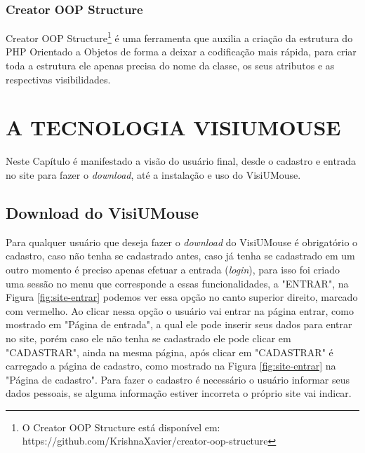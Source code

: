 \subsection{Creator OOP Structure}
Creator OOP Structure\footnote{O Creator OOP Structure está disponível em: https://github.com/KrishnaXavier/creator-oop-structure}  é uma ferramenta que auxilia a criação da estrutura do PHP Orientado a Objetos de forma a deixar a codificação mais rápida, para criar toda a estrutura ele apenas precisa do nome da classe, os seus atributos e as respectivas visibilidades.

\chapter{A TECNOLOGIA VISIUMOUSE}\label{CAP-tecnologia-visiumouse}
Neste Capítulo é manifestado a visão do usuário final, desde o cadastro e entrada no site para fazer o \textit{download}, até a instalação e uso do VisiUMouse. 

\section{Download do VisiUMouse}
Para qualquer usuário que deseja fazer o \textit{download} do VisiUMouse é obrigatório o cadastro, caso não tenha se cadastrado antes, caso já tenha se cadastrado em um outro momento é preciso apenas efetuar a entrada (\textit{login}), para isso foi criado uma sessão no menu que corresponde a essas funcionalidades, a "ENTRAR", na Figura \ref{fig:site-entrar} podemos ver essa opção no canto superior direito, marcado com vermelho. Ao clicar nessa opção o usuário vai entrar na página entrar, como mostrado em "Página de entrada", a qual ele pode inserir seus dados para entrar no site, porém caso ele não tenha se cadastrado ele pode clicar em "CADASTRAR", ainda na mesma página, após clicar em "CADASTRAR" é carregado a página de cadastro, como mostrado na Figura \ref{fig:site-entrar} na "Página de cadastro". Para fazer o cadastro é necessário o usuário informar seus dados pessoais, se alguma informação estiver incorreta o próprio site vai indicar. 

